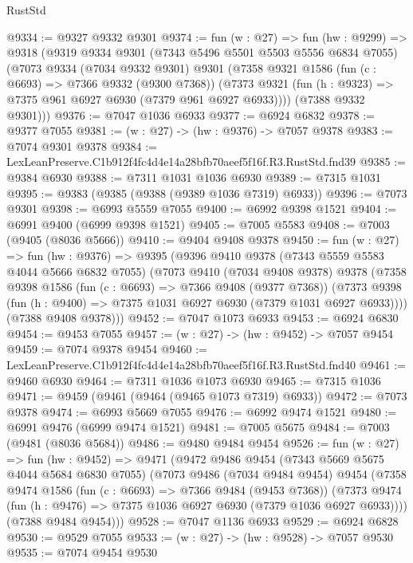 \begin{lexlean}{RustStd}
\begin{coremodule}
@9334 := @9327 @9332 @9301
@9374 := fun (w : @27) =>
  fun (hw : @9299) =>
  @9318
    (@9319
      @9334
      @9301
      (@7343 @5496 @5501 @5503 @5556 @6834 @7055)
      (@7073
        @9334
        (@7034 @9332 @9301)
        @9301
        (@7358
          @9321
          @1586
          (fun (c : @6693) => @7366 @9332 (@9300 @7368))
          (@7373 @9321 (fun (h : @9323) => @7375 @961 @6927 @6930 (@7379 @961 @6927 @6933))))
        (@7388 @9332 @9301)))
@9376 := @7047 @1036 @6933
@9377 := @6924 @6832
@9378 := @9377 @7055
@9381 := (w : @27) -> (hw : @9376) -> @7057 @9378
@9383 := @7074 @9301 @9378
@9384 := LexLeanPreserve.C1b912f4fc4d4e14a28bfb70aeef5f16f.R3.RustStd.fnd39
@9385 := @9384 @6930
@9388 := @7311 @1031 @1036 @6930
@9389 := @7315 @1031
@9395 := @9383 (@9385 (@9388 (@9389 @1036 @7319) @6933))
@9396 := @7073 @9301
@9398 := @6993 @5559 @7055
@9400 := @6992 @9398 @1521
@9404 := @6991 @9400 (@6999 @9398 @1521)
@9405 := @7005 @5583
@9408 := @7003 (@9405 (@8036 @5666))
@9410 := @9404 @9408 @9378
@9450 := fun (w : @27) =>
  fun (hw : @9376) =>
  @9395
    (@9396
      @9410
      @9378
      (@7343 @5559 @5583 @4044 @5666 @6832 @7055)
      (@7073
        @9410
        (@7034 @9408 @9378)
        @9378
        (@7358
          @9398
          @1586
          (fun (c : @6693) => @7366 @9408 (@9377 @7368))
          (@7373 @9398 (fun (h : @9400) => @7375 @1031 @6927 @6930 (@7379 @1031 @6927 @6933))))
        (@7388 @9408 @9378)))
@9452 := @7047 @1073 @6933
@9453 := @6924 @6830
@9454 := @9453 @7055
@9457 := (w : @27) -> (hw : @9452) -> @7057 @9454
@9459 := @7074 @9378 @9454
@9460 := LexLeanPreserve.C1b912f4fc4d4e14a28bfb70aeef5f16f.R3.RustStd.fnd40
@9461 := @9460 @6930
@9464 := @7311 @1036 @1073 @6930
@9465 := @7315 @1036
@9471 := @9459 (@9461 (@9464 (@9465 @1073 @7319) @6933))
@9472 := @7073 @9378
@9474 := @6993 @5669 @7055
@9476 := @6992 @9474 @1521
@9480 := @6991 @9476 (@6999 @9474 @1521)
@9481 := @7005 @5675
@9484 := @7003 (@9481 (@8036 @5684))
@9486 := @9480 @9484 @9454
@9526 := fun (w : @27) =>
  fun (hw : @9452) =>
  @9471
    (@9472
      @9486
      @9454
      (@7343 @5669 @5675 @4044 @5684 @6830 @7055)
      (@7073
        @9486
        (@7034 @9484 @9454)
        @9454
        (@7358
          @9474
          @1586
          (fun (c : @6693) => @7366 @9484 (@9453 @7368))
          (@7373 @9474 (fun (h : @9476) => @7375 @1036 @6927 @6930 (@7379 @1036 @6927 @6933))))
        (@7388 @9484 @9454)))
@9528 := @7047 @1136 @6933
@9529 := @6924 @6828
@9530 := @9529 @7055
@9533 := (w : @27) -> (hw : @9528) -> @7057 @9530
@9535 := @7074 @9454 @9530

\end{coremodule}
\end{lexlean}

